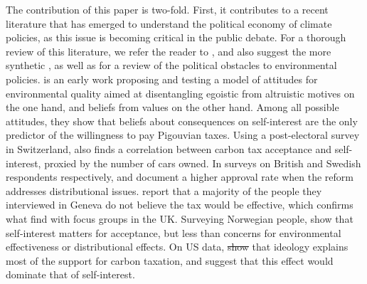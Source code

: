 \documentclass[12pt]{article} %
\providecommand{\DIFaddtex}[1]{{\protect\color{blue}\uwave{#1}}} %
\providecommand{\DIFdeltex}[1]{{\protect\color{red}\sout{#1}}}                      %
\providecommand{\DIFaddbegin}{} %
\providecommand{\DIFaddend}{} %
\providecommand{\DIFdelbegin}{} %
\providecommand{\DIFdelend}{} %
\providecommand{\DIFadd}[1]{\texorpdfstring{\DIFaddtex{#1}}{#1}} %
\providecommand{\DIFdel}[1]{\texorpdfstring{\DIFdeltex{#1}}{}} %
\newcommand{\DIFscaledelfig}{0.5}
\newlength{\DIFdelgraphicswidth} %
\newlength{\DIFdelgraphicsheight} %
\newcommand{\DIFaddincludegraphics}[2][]{{\color{blue}\fbox{\DIFOincludegraphics[#1]{#2}}}} %
\newcommand{\DIFdelincludegraphics}[2][]{%
\sbox{\DIFdelgraphicsbox}{\DIFOincludegraphics[#1]{#2}}%
\settoboxwidth{\DIFdelgraphicswidth}{\DIFdelgraphicsbox} %
\settoboxtotalheight{\DIFdelgraphicsheight}{\DIFdelgraphicsbox} %
\scalebox{\DIFscaledelfig}{%
\parbox[b]{\DIFdelgraphicswidth}{\usebox{\DIFdelgraphicsbox}\\[-\baselineskip] \rule{\DIFdelgraphicswidth}{0em}}\llap{\resizebox{\DIFdelgraphicswidth}{\DIFdelgraphicsheight}{%
\setlength{\unitlength}{\DIFdelgraphicswidth}%
\begin{picture}(1,1)%
\thicklines\linethickness{2pt} %
{\color[rgb]{1,0,0}\put(0,0){\framebox(1,1){}}}%
{\color[rgb]{1,0,0}\put(0,0){\line( 1,1){1}}}%
{\color[rgb]{1,0,0}\put(0,1){\line(1,-1){1}}}%
\end{picture}%
}\hspace*{3pt}}} %
} %
\DeclareRobustCommand{\DIFaddbegin}{\DIFOaddbegin \let\includegraphics\DIFaddincludegraphics} %
\DeclareRobustCommand{\DIFaddend}{\DIFOaddend \let\includegraphics\DIFOincludegraphics} %
\DeclareRobustCommand{\DIFdelbegin}{\DIFOdelbegin \let\includegraphics\DIFdelincludegraphics} %
\DeclareRobustCommand{\DIFdelend}{\DIFOaddend \let\includegraphics\DIFOincludegraphics} %
\begin{document}
The contribution of this paper is two-fold. First, it contributes to a recent literature that has emerged to understand the political economy of climate policies, as this issue is becoming critical in the public debate. For a thorough review of this literature, we refer the reader to  \citet{carattini_overcoming_2018}, and also suggest the more synthetic \citet{klenert_making_2018}, as well as \citet{millner_beliefs_2016} for a review of the political obstacles to environmental policies. \citet{stern_value_1993} is an early work proposing and testing a model of attitudes for environmental quality aimed at disentangling egoistic from altruistic motives on the one hand, and beliefs from values on the other hand. Among all possible attitudes, they show that beliefs about consequences on self-interest are the only predictor of the willingness to pay Pigouvian taxes. Using a post-electoral survey in Switzerland, \citet{thalmann_public_2004} also finds a correlation between carbon tax acceptance and self-interest, proxied by the number of cars owned. In surveys on British and Swedish respondents respectively, \citet{bristow_public_2010} and \citet{brannlund_tax_2012} document a higher approval rate when the reform addresses distributional issues. \citet{baranzini_effectiveness_2017} report that a majority of the people they interviewed in Geneva do not believe the tax would be effective, which confirms what \citet{dresner_history_2006} find with focus groups in the UK. Surveying Norwegian people, \citet{kallbekken_saelen_2011} show that self-interest matters for acceptance, but less than concerns for environmental effectiveness or distributional effects. On US data, \citet{anderson_can_2019} \DIFdelbegin \DIFdel{show }\DIFdelend \DIFaddbegin \DIFadd{argue }\DIFaddend that ideology explains most of the support for carbon taxation, and suggest that this effect would dominate that of self-interest.
\end{document}
